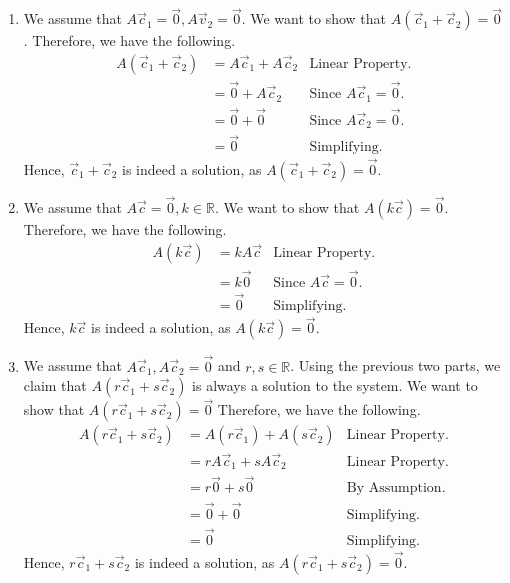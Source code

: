 \begin{SaveQuestion}
\begin{enumerate}
        \item We assume that $A\vec c_1 = \vec 0, A \vec v_2 = \vec 0$. We want to show that $A(\vec c_1 + \vec c_2) = \vec 0$. Therefore, we have the following.
        \begin{align*}
            A(\vec c_1 + \vec c_2)  &= A\vec c_1 + A\vec c_2    &\text{Linear Property.} \\
                                    &= \vec 0 + A\vec c_2       &\text{Since $A\vec c_1
                                    = \vec 0$.} \\
                                    &= \vec 0 + \vec 0          &\text{Since $A\vec c_2
                                    = \vec 0$.} \\
                                    &= \vec 0                   &\text{Simplifying.}
        \end{align*}
        Hence, $\vec c_1 + \vec c_2$ is indeed a solution, as $A(\vec c_1 + \vec c_2) = \vec 0$. 
        
        \item We assume that $A\vec c = \vec 0, k \in \mathbb{R}$. We want to show that $A(k\vec c) = \vec 0$. Therefore, we have the following.
        \begin{align*}
            A(k\vec c)  &= k A\vec c                            &\text{Linear Property.} \\
                                    &= k\vec 0                  &\text{Since $A\vec c = \vec 0$.} \\
                                    &= \vec 0                   &\text{Simplifying.}
        \end{align*}
        Hence, $k \vec c$ is indeed a solution, as $A(k\vec c) = \vec 0$.

        \item We assume that $A\vec c_1, A\vec c_2 = \vec 0$ and $r,s \in \mathbb{R}$. Using the previous two parts, we claim that $A(r \vec c_1 + s \vec c_2)$ is always a solution to the system. We want to show that $A(r \vec c_1 + s \vec c_2) = \vec 0$ Therefore, we have the following.
        \begin{align*}
            A(r \vec c_1 + s \vec c_2)  &= A(r\vec c_1) + A(s \vec c_2)               &\text{Linear Property.} \\
                                        &= r A\vec c_1 + s A\vec c_2    &\text{Linear Property.} \\
                                        &= r \vec 0 + s \vec 0          &\text{By Assumption.} \\
                                        &= \vec 0 + \vec 0              &\text{Simplifying.} \\
                                        &= \vec 0                       &\text{Simplifying.}
        \end{align*}
        Hence, $r \vec c_1 + s \vec c_2$ is indeed a solution, as $A(r \vec c_1 + s \vec c_2) = \vec 0$.


\end{enumerate}
\end{SaveQuestion}
